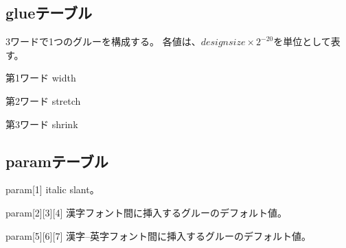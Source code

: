 \documentclass[twoside]{jarticle}
\begin{document}
\subsection{glueテーブル}
3ワードで1つのグルーを構成する。
各値は、$design size\times2^{-20}$を単位として表す。
\begin{description}
\item{第1ワード} width
\item{第2ワード} stretch
\item{第3ワード} shrink
\end{description}
\subsection{paramテーブル}
\begin{description}
\item{param[1]} italic slant。
\item{param[2][3][4]} 漢字フォント間に挿入するグルーのデフォルト値。
\item{param[5][6][7]} 漢字--英字フォント間に挿入するグルーのデフォルト値。
\end{description}
\newpage
\end{document}
